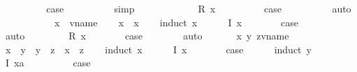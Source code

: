\begin{isabellebody}
\ \ \ \ \ \ \isamarkupfalse%
\ \isamarkupfalse%
\ {\isacharquery}case\isanewline
\ \ \ \ \ \ \ \ \isamarkupfalse%
\ simp\isanewline
\ \ \ \ \isamarkupfalse%
\isanewline
\ \ \ \ \ \ \isamarkupfalse%
\ {\isacharparenleft}R\ x{\isacharparenright}\isanewline
\ \ \ \ \ \ \isamarkupfalse%
\ \isamarkupfalse%
\ {\isacharquery}case\isanewline
\ \ \ \ \ \ \ \ \isamarkupfalse%
\ auto\isanewline
\ \ \ \ \isamarkupfalse%
\isanewline
\ \ \isamarkupfalse%
\isanewline
{}\isamarkupfalse%
\isanewline
\ \ \isamarkupfalse%
\ x\ {\isacharcolon}{\isacharcolon}\ vname\isanewline
\ \ \isamarkupfalse%
\ {\isachardoublequoteopen}x\ {\isasymle}\ x{\isachardoublequoteclose}\isanewline
\ \ \isamarkupfalse%
\ {\isacharparenleft}induct\ x{\isacharparenright}\isanewline
\ \ \ \ \isamarkupfalse%
\ {\isacharparenleft}I\ x{\isacharparenright}\isanewline
\ \ \ \ \isamarkupfalse%
\ \isamarkupfalse%
\ {\isacharquery}case\isanewline
\ \ \ \ \ \ \isamarkupfalse%
\ auto\isanewline
\ \ \isamarkupfalse%
\isanewline
\ \ \ \ \isamarkupfalse%
\ {\isacharparenleft}R\ x{\isacharparenright}\isanewline
\ \ \ \ \isamarkupfalse%
\ \isamarkupfalse%
\ {\isacharquery}case\isanewline
\ \ \ \ \ \ \isamarkupfalse%
\ auto\isanewline
\ \ \isamarkupfalse%
\isanewline
{}\isamarkupfalse%
\isanewline
\ \ \isamarkupfalse%
\ x\ y\ z{\isacharcolon}{\isacharcolon}vname\isanewline
\ \ \isamarkupfalse%
\ {\isachardoublequoteopen}x\ {\isasymle}\ y\ {\isasymLongrightarrow}\ y\ {\isasymle}\ z\ {\isasymLongrightarrow}\ x\ {\isasymle}\ z{\isachardoublequoteclose}\isanewline
\ \ \isamarkupfalse%
\ {\isacharparenleft}induct\ x{\isacharparenright}\isanewline
\ \ \ \ \isamarkupfalse%
\ {\isacharparenleft}I\ x{\isacharparenright}\isanewline
\ \ \ \ \isamarkupfalse%
\ \isamarkupfalse%
\ {\isacharquery}case\isanewline
\ \ \ \ \isamarkupfalse%
\ {\isacharparenleft}induct\ y{\isacharparenright}\isanewline
\ \ \ \ \ \ \isamarkupfalse%
\ {\isacharparenleft}I\ xa{\isacharparenright}\isanewline
\ \ \ \ \ \ \isamarkupfalse%
\ \isamarkupfalse%
\ {\isacharquery}case\isanewline

\end{isabellebody}
